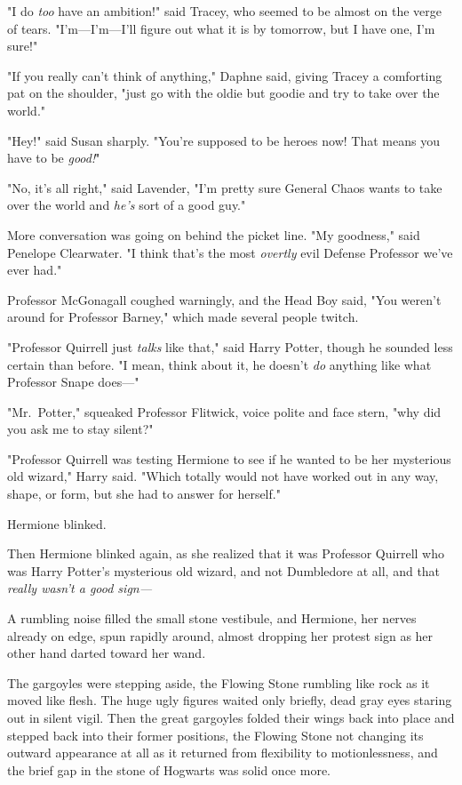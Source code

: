 "I do \emph{too} have an ambition!" said Tracey, who seemed to be almost on the 
verge of tears. "I'm---I'm---I'll figure out what it is by tomorrow, but I have 
one, I'm sure!"

"If you really can't think of anything," Daphne said, giving Tracey a 
comforting pat on the shoulder, "just go with the oldie but goodie and try to 
take over the world."

"Hey!" said Susan sharply. "You're supposed to be heroes now! That means you 
have to be \emph{good!}"

"No, it's all right," said Lavender, "I'm pretty sure General Chaos wants to 
take over the world and \emph{he's} sort of a good guy."

More conversation was going on behind the picket line. "My goodness," said 
Penelope Clearwater. "I think that's the most \emph{overtly} evil Defense 
Professor we've ever had."

Professor McGonagall coughed warningly, and the Head Boy said, "You weren't 
around for Professor Barney," which made several people twitch.

"Professor Quirrell just \emph{talks} like that," said Harry Potter, though he 
sounded less certain than before. "I mean, think about it, he doesn't \emph{do} 
anything like what Professor Snape does---"

"Mr.~Potter," squeaked Professor Flitwick, voice polite and face stern, "why 
did you ask me to stay silent?"

"Professor Quirrell was testing Hermione to see if he wanted to be her 
mysterious old wizard," Harry said. "Which totally would not have worked out in 
any way, shape, or form, but she had to answer for herself."

Hermione blinked.

Then Hermione blinked again, as she realized that it was Professor Quirrell who 
was Harry Potter's mysterious old wizard, and not Dumbledore at all, and that 
\emph{really wasn't a good sign---}

A rumbling noise filled the small stone vestibule, and Hermione, her nerves 
already on edge, spun rapidly around, almost dropping her protest sign as her 
other hand darted toward her wand.

The gargoyles were stepping aside, the Flowing Stone rumbling like rock as it 
moved like flesh. The huge ugly figures waited only briefly, dead gray eyes 
staring out in silent vigil. Then the great gargoyles folded their wings back 
into place and stepped back into their former positions, the Flowing Stone not 
changing its outward appearance at all as it returned from flexibility to 
motionlessness, and the brief gap in the stone of Hogwarts was solid once more.

